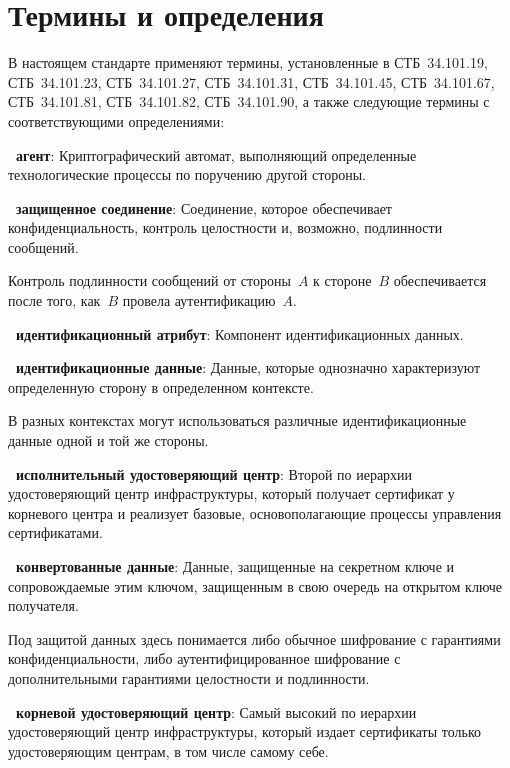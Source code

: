 \chapter{Термины и определения}

В настоящем стандарте применяют термины, установленные в СТБ~34.101.19,
СТБ~34.101.23, СТБ~34.101.27, СТБ~34.101.31, СТБ~34.101.45, СТБ~34.101.67, 
СТБ~34.101.81, СТБ~34.101.82, СТБ~34.101.90, а также следующие термины с 
соответствующими определениями:

{\bf \thedefctr~агент}:
Криптографический автомат, выполняющий определенные технологические процессы по
поручению другой стороны.

{\bf \thedefctr~защищенное соединение}:
Соединение, которое обеспечивает конфиденциальность, контроль целостности и,
возможно, подлинности сообщений.

\begin{note*}
Контроль подлинности сообщений от стороны~$A$ к стороне~$B$ обеспечивается после
того, как~$B$ провела аутентификацию~$A$.
\end{note*}

{\bf \thedefctr~идентификационный атрибут}:
Компонент идентификационных данных. 

{\bf \thedefctr~идентификационные данные}:
Данные, которые однозначно характеризуют определенную сторону в определенном
контексте.

\begin{note*}
В разных контекстах могут использоваться различные идентификационные данные
одной и той же стороны.
\end{note*}

{\bf\thedefctr~исполнительный удостоверяющий центр}:
Второй по иерархии удостоверяющий центр инфраструктуры, который получает 
сертификат у корневого центра и реализует базовые, основополагающие процессы 
управления сертификатами.

{\bf \thedefctr~конвертованные данные}:
Данные, защищенные на секретном ключе и сопровождаемые этим ключом, защищенным 
в свою очередь на открытом ключе получателя.

\begin{note*}
Под защитой данных здесь понимается либо обычное шифрование с гарантиями
конфиденциальности, либо аутентифицированное шифрование с дополнительными 
гарантиями целостности и подлинности.
\end{note*}

{\bf\thedefctr~корневой удостоверяющий центр}:
Самый высокий по иерархии удостоверяющий центр инфраструктуры, который издает 
сертификаты только удостоверяющим центрам, в том числе самому себе.

